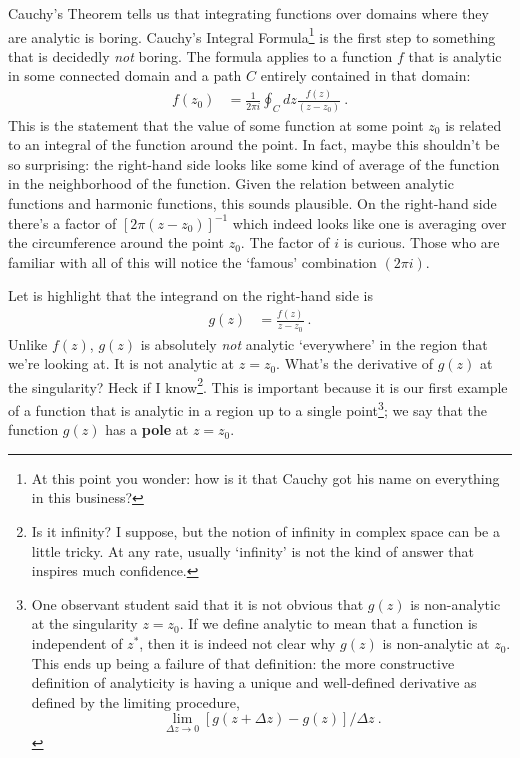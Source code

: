 Cauchy's Theorem tells us that integrating functions over domains where they are analytic is boring. Cauchy's Integral Formula\footnote{At this point you wonder: how is it that Cauchy got his name on everything in this business?} is the first step to something that is decidedly \emph{not} boring. The formula applies to a function $f$ that is analytic in some connected domain and a path $C$ entirely contained in that domain:
\begin{align}
	f(z_0) &= \frac{1}{2\pi i} \oint_C dz \frac{f(z)}{(z-z_0)}  \ .
	\label{eq:cauchy:integral}
\end{align}
This is the statement that the value of some function at some point $z_0$ is related to an integral of the function around the point. In fact, maybe this shouldn't be so surprising: the right-hand side looks like some kind of average of the function in the neighborhood of the function. Given the relation between analytic functions and harmonic functions, this sounds plausible. On the right-hand side there's a factor of $[2\pi (z-z_0)]^{-1}$ which indeed looks like one is averaging over the circumference around the point $z_0$. The factor of $i$ is curious. Those who are familiar with all of this will notice the `famous' combination $(2\pi i)$.

Let is highlight that the integrand on the right-hand side is 
\begin{align}
	g(z) &= \frac{f(z)}{z-z_0} \ .
	\label{eq:g:z:cauchy:integral:theorem}
\end{align}
Unlike $f(z)$, $g(z)$ is absolutely \emph{not} analytic `everywhere' in the region that we're looking at. It is not analytic at $z=z_0$. What's the derivative of $g(z)$ at the singularity? Heck if I know\footnote{Is it infinity? I suppose, but the notion of infinity in complex space can be a little tricky. At any rate, usually `infinity' is not the kind of answer that inspires much confidence.}. This is important because it is our first example of a function that is analytic in a region up to a single point\footnote{%
%
One observant student said that it is not obvious that $g(z)$ is non-analytic at the singularity $z=z_0$. If we define analytic to mean that a function is independent of $z^*$, then it is indeed not clear why $g(z)$ is non-analytic at $z_0$. This ends up being a failure of that definition: the more constructive definition of analyticity is having a unique and well-defined derivative as defined by the limiting procedure, $$\lim_{\Delta z\to 0}[g(z+\Delta z)-g(z)]/\Delta z \ .$$ 
%
}; we say that the function $g(z)$ has a \textbf{pole} at $z=z_0$.


